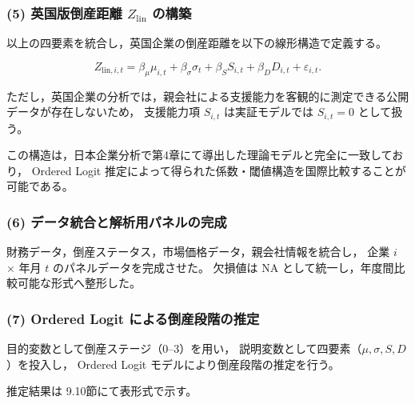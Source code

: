 
\subsubsection{(5) 英国版倒産距離 $Z_{\text{lin}}$ の構築}

以上の四要素を統合し，英国企業の倒産距離を以下の線形構造で定義する。



\[
Z_{\text{lin},i,t}
= \beta_\mu \mu_{i,t}
+ \beta_\sigma \sigma_{t}
+ \beta_S S_{i,t}
+ \beta_D D_{i,t}
+ \varepsilon_{i,t}.
\]



ただし，英国企業の分析では，親会社による支援能力を客観的に測定できる公開データが存在しないため，
支援能力項 $S_{i,t}$ は実証モデルでは $S_{i,t}=0$ として扱う。

この構造は，日本企業分析で第4章にて導出した理論モデルと完全に一致しており，
Ordered Logit 推定によって得られた係数・閾値構造を国際比較することが可能である。


\subsubsection{(6) データ統合と解析用パネルの完成}

財務データ，倒産ステータス，市場価格データ，親会社情報を統合し，
企業 $i$ × 年月 $t$ のパネルデータを完成させた。
欠損値は NA として統一し，年度間比較可能な形式へ整形した。


\subsubsection{(7) Ordered Logit による倒産段階の推定}

目的変数として倒産ステージ（0--3）を用い，
説明変数として四要素（$\mu, \sigma, S, D$）を投入し，
Ordered Logit モデルにより倒産段階の推定を行う。

推定結果は 9.10節にて表形式で示す。


